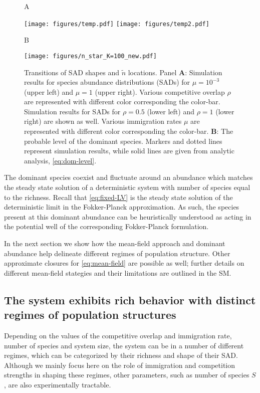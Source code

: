 \documentclass[9pt,twocolumn,twoside,lineno]{pnas-new}
\begin{document}
\begin{figure}[t!]
   \begin{flushleft}
        A
   \end{flushleft}
   \texttt{[image: figures/temp.pdf]}
    \texttt{[image: figures/temp2.pdf]}
    \begin{flushleft}
        B
   \end{flushleft}
    \texttt{[image: figures/n\_star\_K=100\_new.pdf]}
    \caption{Transitions of SAD shapes and $\tilde{n}$ locations. Panel \textbf{A}: Simulation results for species abundance distributions (SADs) for $\mu=10^{-3}$ (upper left) and $\mu=1$ (upper right). Various competitive overlap $\rho$ are represented with different color corresponding the color-bar.
     Simulation results for SADs for $\rho=0.5$ (lower left) and $\rho=1$ (lower right) are shown as well. Various immigration rates $\mu$ are represented with different color corresponding the color-bar.
    \textbf{B}: The probable level of the dominant species. Markers and dotted lines represent simulation results, while solid lines are given from analytic analysis, \eqref{eq:dom-level}.         }
 \label{fig:Fig3}
\end{figure}


The dominant species coexist and fluctuate around an abundance which matches the steady state solution of a deterministic system with number of species equal to the richness.
Recall that \eqref{eq:fixed-LV} is the steady state solution of the deterministic limit in the Fokker-Planck approximation.
As such, the species present at this dominant abundance can be heuristically understood as acting in the potential well of the corresponding Fokker-Planck formulation.

In the next section we show how the mean-field approach and dominant abundance help delineate different regimes of population structure.
Other approximate closures for \eqref{eq:mean-field} are possible as well; further details on different mean-field stategies and their limitations are outlined in the SM.

\subsection{The system exhibits rich behavior with distinct regimes of population structures } 
\label{sec:Phases}
Depending on the values of the competitive overlap and immigration rate, number of species and system size, the system can be in a number of different regimes, which can be categorized by their richness and shape of their SAD.
Although we mainly focus here on the role of immigration and competition strengths in shaping these regimes, other parameters, such as number of species $S$, are also experimentally tractable.
\end{document}
